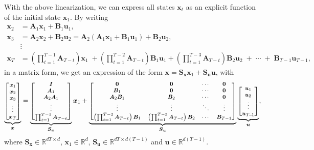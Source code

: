 \documentclass[10pt,a4paper]{article} %
\begin{document}
With the above linearization, we can express all states $\bm{x}_t$ as an explicit function of the initial state $\bm{x}_1$. 
By writing
\begin{align*}
	\bm{x}_{2} &= \bm{A}_1 \bm{x}_1 + \bm{B}_1 \bm{u}_1 ,\\
	\bm{x}_{3} &= \bm{A}_2 \bm{x}_2 + \bm{B}_2 \bm{u}_2 = \bm{A}_2 (\bm{A}_1 \bm{x}_1 + \bm{B}_1 \bm{u}_1) + \bm{B}_2 \bm{u}_2 ,\\[-2mm]
	&\vdots\\[-2mm]
	\bm{x}_{T} &= \left(\prod_{t=1}^{T-1} \bm{A}_{T-t}\right) \bm{x}_1 \;+ \left(\prod_{t=1}^{T-2} \bm{A}_{T-t}\right) \bm{B}_1 \bm{u}_1 + 
	\left(\prod_{t=1}^{T-3} \bm{A}_{T-t}\right) \bm{B}_2 \bm{u}_2 \;+\; \cdots \;+\; \bm{B}_{T-1} \bm{u}_{T-1},
\end{align*}
in a matrix form, we get an expression of the form $\bm{x}=\bm{S}_{\bm{x}}\bm{x}_1+\bm{S}_{\bm{u}}\bm{u}$, with
\begin{equation}
	\footnotesize %
	\underbrace{
 	\begin{bmatrix}
 	\bm{x}_1\\
 	\bm{x}_2\\
 	\bm{x}_3\\
 	\vdots\\
 	\bm{x}_T
 	\end{bmatrix}}_{\bm{x}}
 	=
 	\underbrace{
 	\begin{bmatrix}
 	\bm{I}\\
 	\bm{A}_1\\
 	\bm{A}_2\bm{A}_1\\
 	\vdots\\
 	\prod_{t=1}^{T-1} \bm{A}_{T-t}
 	\end{bmatrix}}_{\bm{S}_{\bm{x}}}
 	\bm{x}_1
	+ 
	\footnotesize %
 	\underbrace{
 	\begin{bmatrix}
 	\bm{0} & \bm{0} & \cdots & \bm{0} \\
 	\bm{B}_1 & \bm{0} & \cdots & \bm{0} \\
	\bm{A}_2\bm{B}_1 & \bm{B}_2 & \cdots & \bm{0} \\
	\vdots & \vdots & \ddots & \vdots \\
	\left(\prod_{t=1}^{T-2} \bm{A}_{T-t}\right) \bm{B}_1 & \left(\prod_{t=1}^{T-3} \bm{A}_{T-t}\right) \bm{B}_2 & \cdots & \bm{B}_{T-1}
	\end{bmatrix}}_{\bm{S}_{\bm{u}}}
	\underbrace{
	\begin{bmatrix}
	\bm{u}_1\\
 	\bm{u}_2\\
 	\vdots\\
 	\bm{u}_{T\!-\!1}
 	\end{bmatrix}}_{\bm{u}},
 	\label{eq:SxSu}
\end{equation}
where $\bm{S}_{\bm{x}}\!\in\!\mathbb{R}^{dT\times d}$, $\bm{x}_1\!\in\!\mathbb{R}^d$, $\bm{S}_{\bm{u}}\!\in\!\mathbb{R}^{dT\times d(T-1)}$ and $\bm{u}\!\in\!\mathbb{R}^{d(T-1)}$. 
\end{document}
